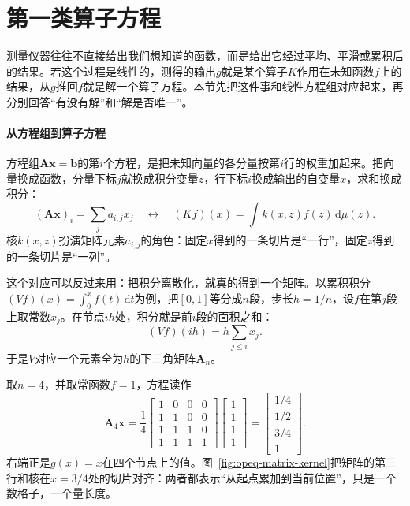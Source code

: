\section{第一类算子方程}
\label{sec:opeq-first-kind}

测量仪器往往不直接给出我们想知道的函数，而是给出它经过平均、平滑或累积后的结果。若这个过程是线性的，测得的输出$g$就是某个算子$K$作用在未知函数$f$上的结果，从$g$推回$f$就是解一个算子方程。本节先把这件事和线性方程组对应起来，再分别回答“有没有解”和“解是否唯一”。

\paragraph{从方程组到算子方程}
方程组$\bm A\bm x=\bm b$的第$i$个方程，是把未知向量的各分量按第$i$行的权重加起来。把向量换成函数，分量下标$j$就换成积分变量$z$，行下标$i$换成输出的自变量$x$，求和换成积分：
\begin{equation}
  (\bm A\bm x)_i=\sum_j a_{i,j}x_j
  \quad\longleftrightarrow\quad
  (Kf)(x)=\int k(x,z)f(z)\,\mathrm d\mu(z).
  \label{eq:opeq-matrix-integral}
\end{equation}
核$k(x,z)$扮演矩阵元素$a_{i,j}$的角色：固定$x$得到的一条切片是“一行”，固定$z$得到的一条切片是“一列”。

这个对应可以反过来用：把积分离散化，就真的得到一个矩阵。以累积积分$(Vf)(x)=\int_0^xf(t)\,\mathrm dt$为例，把$[0,1]$等分成$n$段，步长$h=1/n$，设$f$在第$j$段上取常数$x_j$。在节点$ih$处，积分就是前$i$段的面积之和：
\[
  (Vf)(ih)=h\sum_{j\leq i}x_j.
\]
于是$V$对应一个元素全为$h$的下三角矩阵$\bm A_n$。

取$n=4$，并取常函数$f=1$，方程读作
\[
  \bm A_4\bm x
  =\frac14\begin{bmatrix}1&0&0&0\\1&1&0&0\\1&1&1&0\\1&1&1&1\end{bmatrix}
  \begin{bmatrix}1\\1\\1\\1\end{bmatrix}
  =\begin{bmatrix}1/4\\1/2\\3/4\\1\end{bmatrix}.
\]
右端正是$g(x)=x$在四个节点上的值。图~\ref{fig:opeq-matrix-kernel}把矩阵的第三行和核在$x=3/4$处的切片对齐：两者都表示“从起点累加到当前位置”，只是一个数格子，一个量长度。

